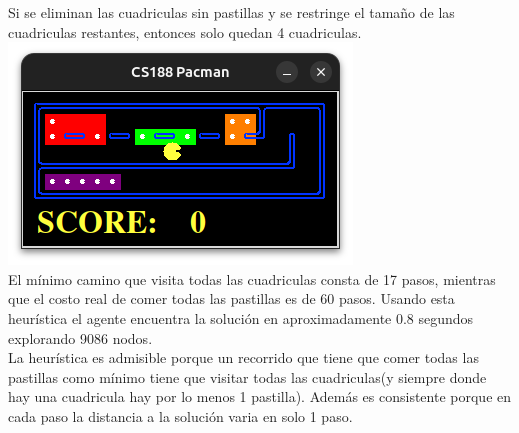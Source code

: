 \documentclass[12pt, titlepage, a4paper]{article}
\begin{document}
Si se eliminan las cuadriculas sin pastillas y se restringe el tamaño de las cuadriculas restantes, entonces solo quedan 4 cuadriculas.\\

\includegraphics[width=.8\textwidth]{Imagenes/image.png}\\

El mínimo camino que visita todas las cuadriculas consta de 17 pasos, mientras
que el costo real de comer todas las pastillas es de 60 pasos. Usando esta
heurística el agente encuentra la solución en aproximadamente 0.8 segundos
explorando 9086 nodos.\\

La heurística es admisible porque un recorrido que tiene que comer todas las
pastillas como mínimo tiene que visitar todas las cuadriculas(y siempre donde
hay una cuadricula hay por lo menos 1 pastilla). Además es consistente porque en cada paso la distancia a la solución varia en solo 1 paso.\\
\end{document}
